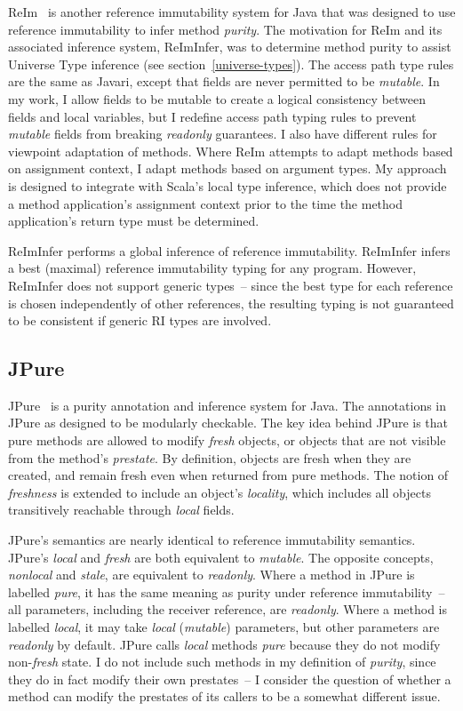 \documentclass[letterpaper,11pt]{article}
\theoremstyle{definition}
\theoremstyle{remark}
\begin{document}
ReIm~\cite{reim} is another reference immutability system for Java that
was designed to use reference immutability to infer method \emph{purity}.
The motivation for ReIm and its associated inference system, ReImInfer,
was to determine method purity to assist Universe Type inference (see section~\ref{universe-types}).
The access path type rules are the same as Javari, except that
fields are never permitted to be \emph{mutable}.
In my work, I allow fields to be mutable to create a logical consistency
between fields and local variables, but I redefine access path typing rules
to prevent \emph{mutable} fields from breaking \emph{readonly} guarantees.
I also have different rules for viewpoint adaptation of methods.
Where ReIm attempts to adapt methods based on assignment context,
I adapt methods based on argument types.
My approach is designed to integrate with Scala's local type inference,
which does not provide a method application's assignment context prior to the time
the method application's return type must be determined.

ReImInfer performs a global inference of reference immutability.
ReImInfer infers a best (maximal) reference immutability typing for any program.
However, ReImInfer does not support generic types~--
since the best type for each reference is chosen independently of
other references, the resulting typing is not guaranteed to be consistent
if generic RI types are involved.

\subsection{JPure}

JPure~\cite{jpure} is a purity annotation and inference system for Java.
The annotations in JPure as designed to be modularly checkable.
The key idea behind JPure is that pure methods are allowed to
modify \emph{fresh} objects, or objects that are not visible from the method's
\emph{prestate}.
By definition, objects are fresh when they are created,
and remain fresh even when returned from pure methods.
The notion of \emph{freshness} is extended to include
an object's \emph{locality}, which includes all objects transitively reachable through \emph{local}
fields.

JPure's semantics are nearly identical to reference immutability semantics.
JPure's \emph{local} and \emph{fresh} are both equivalent to \emph{mutable}.
The opposite concepts, \emph{nonlocal} and \emph{stale}, are equivalent to \emph{readonly}.
Where a method in JPure is labelled \emph{pure}, it has the same meaning
as purity under reference immutability~-- all parameters, including the receiver reference,
are \emph{readonly}. Where a method is labelled \emph{local},
it may take \emph{local} (\emph{mutable}) parameters, but other parameters are \emph{readonly} by default.
JPure calls \emph{local} methods \emph{pure} because they do not modify non-\emph{fresh}
state. I do not include such methods in my definition of \emph{purity},
since they do in fact modify their own prestates~-- I consider the question of
whether a method can modify the prestates of its callers to be a somewhat different
issue.
\end{document}
